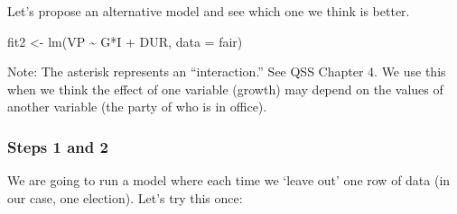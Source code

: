 \documentclass[
  letterpaper,
  DIV=11,
  numbers=noendperiod]{scrreprt}
\newenvironment{Shaded}{\begin{snugshade}}{\end{snugshade}}
\newcommand{\AttributeTok}[1]{\textcolor[rgb]{0.40,0.45,0.13}{#1}}
\newcommand{\DecValTok}[1]{\textcolor[rgb]{0.68,0.00,0.00}{#1}}
\newcommand{\DocumentationTok}[1]{\textcolor[rgb]{0.37,0.37,0.37}{\textit{#1}}}
\newcommand{\FunctionTok}[1]{\textcolor[rgb]{0.28,0.35,0.67}{#1}}
\newcommand{\NormalTok}[1]{\textcolor[rgb]{0.00,0.23,0.31}{#1}}
\newcommand{\OtherTok}[1]{\textcolor[rgb]{0.00,0.23,0.31}{#1}}
\newcommand{\SpecialCharTok}[1]{\textcolor[rgb]{0.37,0.37,0.37}{#1}}
\begin{document}
Let's propose an alternative model and see which one we think is better.

\begin{Shaded}
\begin{Highlighting}[]
\NormalTok{fit2 }\OtherTok{\textless{}{-}} \FunctionTok{lm}\NormalTok{(VP }\SpecialCharTok{\textasciitilde{}}\NormalTok{ G}\SpecialCharTok{*}\NormalTok{I }\SpecialCharTok{+}\NormalTok{  DUR, }\AttributeTok{data =}\NormalTok{ fair)}
\end{Highlighting}
\end{Shaded}

Note: The asterisk represents an ``interaction.'' See QSS Chapter 4. We
use this when we think the effect of one variable (growth) may depend on
the values of another variable (the party of who is in office).

\hypertarget{steps-1-and-2}{%
\subsubsection{Steps 1 and 2}\label{steps-1-and-2}}

We are going to run a model where each time we `leave out' one row of
data (in our case, one election). Let's try this once:

\begin{Shaded}
\end{Shaded}
\end{document}
